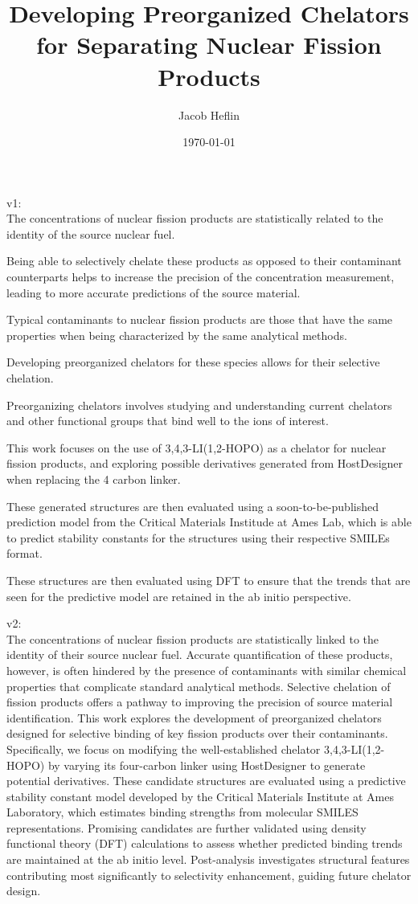 \documentclass{article}
\title{Developing Preorganized Chelators for Separating Nuclear Fission Products}
\author{Jacob Heflin}
\date{\today}
\begin{document}
\maketitle
v1: \\
The concentrations of nuclear fission products are statistically related to the identity of the source nuclear fuel.

Being able to selectively chelate these products as opposed to their contaminant counterparts helps to increase the
precision of the concentration measurement, leading to more accurate predictions of the
source material.

Typical contaminants to nuclear fission products are those that have the same properties when being
characterized by the same analytical methods.

Developing preorganized chelators for these species allows for their
selective chelation.

Preorganizing chelators involves studying and understanding current chelators and other functional
groups that bind well to the ions of interest.

This work focuses on the use of 3,4,3-LI(1,2-HOPO) as a chelator for
nuclear fission products, and exploring possible derivatives generated from HostDesigner when replacing the 4 carbon
linker.

These generated structures are then evaluated using a soon-to-be-published prediction model from the Critical
Materials Institude at Ames Lab, which is able to predict stability constants for the structures using their respective
SMILEs format.

These structures are then evaluated using DFT to ensure that the trends that are seen for the predictive
model are retained in the ab initio perspective.

v2: \\
The concentrations of nuclear fission products are statistically linked to the identity of their source nuclear fuel.
Accurate quantification of these products, however, is often hindered by the presence of contaminants with similar
chemical properties that complicate standard analytical methods. Selective chelation of fission products offers a
pathway to improving the precision of source material identification. This work explores the development of preorganized
chelators designed for selective binding of key fission products over their contaminants. Specifically, we focus on
modifying the well-established chelator 3,4,3-LI(1,2-HOPO) by varying its four-carbon linker using HostDesigner to
generate potential derivatives. These candidate structures are evaluated using a predictive stability constant model
developed by the Critical Materials Institute at Ames Laboratory, which estimates binding strengths from molecular
SMILES representations. Promising candidates are further validated using density functional theory (DFT) calculations
to assess whether predicted binding trends are maintained at the ab initio level. Post-analysis investigates structural
features contributing most significantly to selectivity enhancement, guiding future chelator design.
\end{document}
